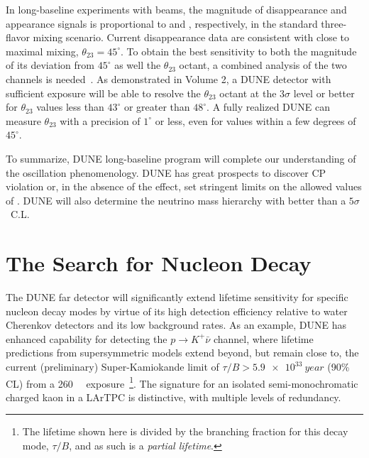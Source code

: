 In long-baseline experiments with \numu beams, the
magnitude of \numu disappearance and \nue appearance signals is
proportional to  and ,
respectively, in the standard three-flavor mixing scenario.  Current
\numu disappearance data are consistent with close to maximal
mixing, $\theta_{23} = 45^\circ$.  To obtain the best sensitivity to
both the magnitude of its deviation from $45^\circ$ as well the 
$\theta_{23}$ octant, a combined analysis of the two channels
is needed~\cite{Huber:2010dx}.  As demonstrated in Volume 2, a
 DUNE detector with sufficient exposure will be able to
resolve the $\theta_{23}$ octant at the $3\sigma$ level or better for
$\theta_{23}$ values less than $43^\circ$ or greater than $48^\circ$.
A fully realized DUNE can measure $\theta_{23}$ with a precision of
$1^\circ$ or less, even for values within a few degrees of
$45^\circ$. 

To summarize, DUNE long-baseline program will complete
our understanding of the oscillation phenomenology. 
DUNE has great prospects to discover CP violation or, in the absence of the
effect, set stringent limits on the allowed values of \deltacp. 
DUNE will also determine the neutrino mass hierarchy with better
than a $5\sigma$~C.L.


\section{The Search for Nucleon Decay}

The DUNE far detector will significantly extend lifetime sensitivity
for specific nucleon decay modes by virtue of its high detection
efficiency relative to water Cherenkov detectors and its low
background rates.  As an example, DUNE has enhanced capability for
detecting the $p\to K^+\bar{\nu}$ channel, where lifetime
predictions from supersymmetric models extend beyond, but remain close
to, the current (preliminary) Super-Kamiokande limit of $\tau/B >
\SI{5.9e33}{year}$ (90\% CL) from a \SI[number-unit-product = -,
inter-unit-product=\ensuremath{{}\cdot{}}]{260}{\kt\year}
exposure~\cite{kearns_isoups}\footnote{The lifetime shown here is
  divided by the branching fraction for this decay mode, $\tau/B$, and
  as such is a \emph{partial lifetime}.}.  The signature for an
isolated semi-monochromatic charged kaon in a LArTPC is distinctive,
with multiple levels of redundancy. 

